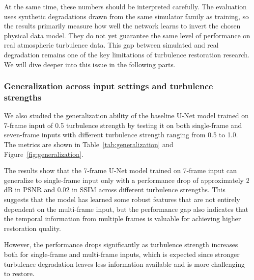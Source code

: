 \documentclass{article}
\begin{document}
At the same time, these numbers should be interpreted carefully. The evaluation uses synthetic degradations drawn from the same simulator family as training, so the results primarily measure how well the network learns to invert the chosen physical data model. They do not yet guarantee the same level of performance on real atmospheric turbulence data. This gap between simulated and real degradation remains one of the key limitations of turbulence restoration research. We will dive deeper into this issue in the following parts.

\subsubsection{Generalization across input settings and turbulence strengths}
We also studied the generalization ability of the baseline U-Net model trained on 7-frame input of 0.5 turbulence strength by testing it on both single-frame and seven-frame inputs with different turbulence strength ranging from 0.5 to 1.0. The metrics are shown in Table~\ref{tab:generalization} and Figure~\ref{fig:generalization}. 


The results show that the 7-frame U-Net model trained on 7-frame input can generalize to single-frame input only with a performance drop of approximately 2 dB in PSNR and 0.02 in SSIM across different turbulence strengths. This suggests that the model has learned some robust features that are not entirely dependent on the multi-frame input, but the performance gap also indicates that the temporal information from multiple frames is valuable for achieving higher restoration quality.

However, the performance drops significantly as turbulence strength increases both for single-frame and multi-frame inputs, which is expected since stronger turbulence degradation leaves less information available and is more challenging to restore.
\end{document}
